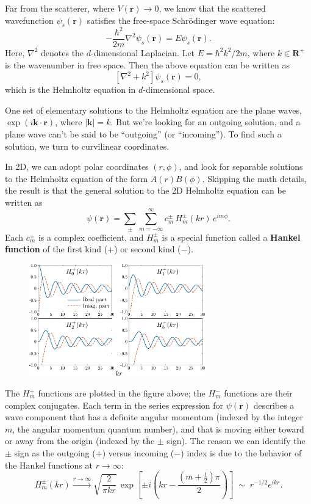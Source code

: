 \documentclass[pra,12pt]{revtex4}
\begin{document}
Far from the scatterer, where $V(\mathbf{r})\rightarrow 0$, we know
that the scattered wavefunction $\psi_s(\mathbf{r})$ satisfies the
free-space Schr\"odinger wave equation:
$$-\frac{\hbar^2}{2m} \nabla^2 \psi_s(\mathbf{r}) = E \psi_s(\mathbf{r}).$$
Here, $\nabla^2$ denotes the $d$-dimensional Laplacian.  Let $E =
\hbar^2 k^2 / 2m$, where $k \in \mathbf{R}^+$ is the wavenumber in
free space.  Then the above equation can be written as
$$\left[\nabla^2 + k^2\right] \psi_s(\mathbf{r}) = 0,$$
which is the Helmholtz equation in $d$-dimensional space.

One set of elementary solutions to the Helmholtz equation are the
plane waves, $\exp(i\mathbf{k}\cdot\mathbf{r})$, where $|\mathbf{k}| =
k$.  But we're looking for an outgoing solution, and a plane wave
can't be said to be ``outgoing'' (or ``incoming'').  To find such a
solution, we turn to curvilinear coordinates.

In 2D, we can adopt polar coordinates $(r,\phi)$, and look for
separable solutions to the Helmholtz equation of the form
$A(r)B(\phi)$.  Skipping the math details, the result is that the
general solution to the 2D Helmholtz equation can be written as
$$\psi(\mathbf{r})=\sum_{\pm}\sum_{m=-\infty}^\infty c_m^\pm\,H_m^\pm(kr)\,e^{im\phi}.$$
Each $c_m^\pm$ is a complex coefficient, and $H_m^\pm$ is a special
function called a \textbf{Hankel function} of the first kind ($+$) or second
kind ($-$).

\begin{figure}[h!]
  \centering\includegraphics[width=0.68\textwidth]{besselh}
\end{figure}

The $H^+_m$ functions are plotted in the figure above; the $H^-_m$
functions are their complex conjugates.  Each term in the series
expression for $\psi(\mathbf{r})$ describes a wave component that has
a definite angular momentum (indexed by the integer $m$, the angular
momentum quantum number), and that is moving either toward or away
from the origin (indexed by the $\pm$ sign).  The reason we can
identify the $\pm$ sign as the outgoing ($+$) versus incoming ($-$)
index is due to the behavior of the Hankel functions at $r\rightarrow
\infty$:
$$H_m^\pm(kr) \overset{r\rightarrow\infty}{\longrightarrow} \sqrt{\frac{2}{\pi kr}} \, \exp\left[\pm i\left(kr - \frac{(m+\frac{1}{2})\pi}{2}\right)\right] \;\sim\; r^{-1/2} e^{ikr}.$$
\end{document}
